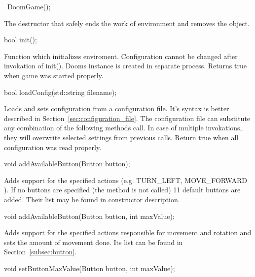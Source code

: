 \vspace{20pt}
\begin{clinee}
~DoomGame();
\end{clinee}

The destructor that safely ends the work of environment and removes the object.


\vspace{20pt}
\begin{clinee}
bool init();
\end{clinee}

Function which initializes enviroment. Configuration cannot be changed after invokation of init(). Dooms instance is created in separate process. Returns true when game was started properly. 


\vspace{20pt}
\begin{clinee}
bool loadConfig(std::string filename);
\end{clinee}

Loads and sets configuration from a configuration file. It's syntax is better described in Section~\ref{sec:configuration_file}. The configuration file can substitute any combination of the following methods call. In case of multiple invokations, they will overwrite selected settings from previous calls. Return true when all configuration was read properly.


\vspace{20pt}
\begin{clinee}
void addAvailableButton(Button button);
\end{clinee}

Adds support for the specified actions (e.g. TURN\_LEFT, MOVE\_FORWARD ). If no buttons are specified (the method is not called) 11 default buttons are added. Their list may be found in constructor description.


\vspace{20pt}
\begin{clinee}
void addAvailableButton(Button button, int maxValue);
\end{clinee}

Adds support for the specified actions responsible for movement and rotation and sets the amount of movement done. Its list can be found in Section~\ref{subsec:button}.


\vspace{20pt}
\begin{clinee}
void setButtonMaxValue(Button button, int maxValue);
\end{clinee}


